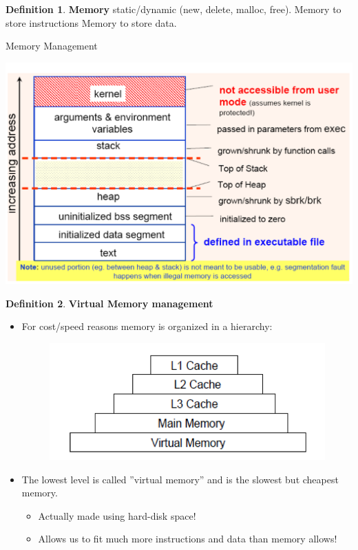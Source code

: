 \documentclass[11pt,a4paper]{article}
\theoremstyle{definition}
\newtheorem{definition}{Definition}[section]
\newenvironment{myitemize}
{ \begin{itemize}
    \setlength{\itemsep}{5pt}
    \setlength{\parskip}{0pt}
    \setlength{\parsep}{0pt}     }
{ \end{itemize}                  }
\begin{document}
\begin{definition}{\textbf{Memory}}
	static/dynamic (\textsf{new, delete, malloc, free}). Memory to store instructions
Memory to store data.
\end{definition}

\begin{tcolorbox}
	\textsf{Memory Management}
	
	\includegraphics[scale=0.3]{m1/memoryManagement}
	\centering
\end{tcolorbox}

\begin{definition}{\textbf{Virtual Memory management}}
\begin{myitemize}
	\item For cost/speed reasons memory is organized in a hierarchy:
	\begin{figure}[h!]
		\includegraphics[scale=0.6]{m1/memoryHirarchy}
		\centering
	\end{figure}
	\item The lowest level is called ''virtual memory'' and is the slowest but cheapest memory.
	\begin{myitemize}
	\item Actually made using hard-disk space!
	\item Allows us to fit much more instructions and data than memory allows!
	\end{myitemize}
\end{myitemize}
\end{definition}
\end{document}
